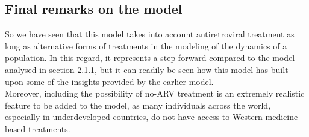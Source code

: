 \subsection{Final remarks on the model}
So we have seen that this model takes into account antiretroviral treatment as long as alternative forms of treatments in the modeling of the dynamics of a population. In this regard, it represents a step forward compared to the model analysed in section 2.1.1, but it can readily be seen how this model has built upon some of the insights provided by the earlier model.\\
Moreover, including the possibility of no-ARV treatment is an extremely realistic feature to be added to the model, as many individuals across the world, especially in underdeveloped countries, do not have access to Western-medicine-based treatments.